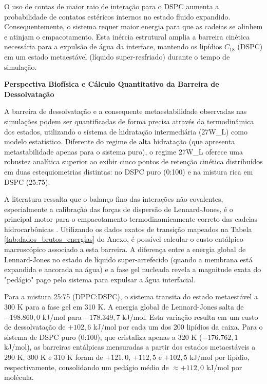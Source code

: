 O uso de contas de maior raio de interação para o DSPC \cite{liu2012} aumenta a probabilidade de contatos estéricos internos no estado fluido expandido. Consequentemente, o sistema requer maior energia para que as cadeias se alinhem e atinjam o empacotamento. Esta inércia estrutural amplia a barreira cinética necessária para a expulsão de água da interface, mantendo os lipídios $C_{18}$ (DSPC) em um estado metaestável (líquido super-resfriado) durante o tempo de simulação.


\vspace{1em}
\noindent\textbf{Perspectiva Biofísica e Cálculo Quantitativo da Barreira de Dessolvatação }

A barreira de dessolvatação e a consequente metaestabilidade observadas nas simulações podem ser quantificadas de forma precisa através da termodinâmica dos estados, utilizando o sistema de hidratação intermediária (27W\_L) como modelo estatístico. Diferente do regime de alta hidratação (que apresenta metastabilidade apenas para o sistema puro), o regime 27W\_L oferece uma robustez analítica superior ao exibir cinco pontos de retenção cinética distribuídos em duas estequiometrias distintas: no DSPC puro (0:100) e na mistura rica em DSPC (25:75).

A literatura ressalta que o balanço fino das interações não covalentes, especialmente a calibração das forças de dispersão de Lennard-Jones, é o principal motor para o empacotamento termodinamicamente correto das cadeias hidrocarbônicas \cite{liu2012}. Utilizando os dados exatos de transição mapeados na Tabela \ref{tab:dados_brutos_energias} do Anexo, é possível calcular o custo entálpico macroscópico associado a esta barreira. A diferença entre a energia global de Lennard-Jones no estado de líquido super-arrefecido (quando a membrana está expandida e ancorada na água) e a fase gel nucleada revela a magnitude exata do "pedágio" pago pelo sistema para expulsar a água interfacial.

Para a mistura 25:75 (DPPC:DSPC), o sistema transita do estado metaestável a 300 K para a fase gel em 310 K. A energia global de Lennard-Jones salta de $-198.860,0$ kJ/mol para $-178.349,7$ kJ/mol. Esta variação resulta em um custo de dessolvatação de $+102,6$ kJ/mol por cada um dos 200 lipídios da caixa. Para o sistema de DSPC puro (0:100), que cristaliza apenas a 320 K ($-176.762,1$ kJ/mol), as barreiras entálpicas mensuradas a partir dos estados metaestáveis a 290 K, 300 K e 310 K foram de $+121,0$, $+112,5$ e $+102,5$ kJ/mol por lipídio, respectivamente, consolidando um pedágio médio de $\approx +112,0$ kJ/mol por molécula.

